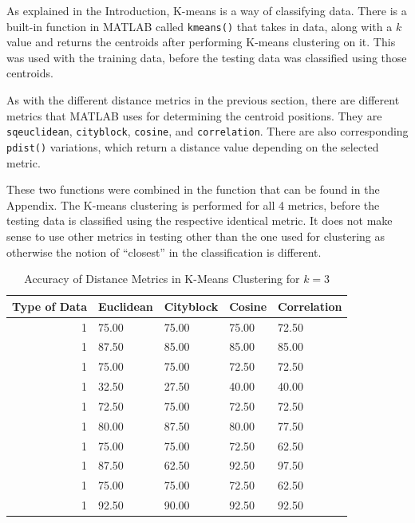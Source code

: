 \documentclass[a4paper, 10pt, conference]{ieeeconf}
\begin{document}
As explained in the Introduction, K-means is a way of classifying data. There is a built-in function in MATLAB called \texttt{kmeans()} that takes in data, along with a $k$ value and returns the centroids after performing K-means clustering on it. This was used with the training data, before the testing data was classified using those centroids.

As with the different distance metrics in the previous section, there are different metrics that MATLAB uses for determining the centroid positions. They are \texttt{sqeuclidean}, \texttt{cityblock}, \texttt{cosine}, and \texttt{correlation}. There are also corresponding \texttt{pdist()} variations, which return a distance value depending on the selected metric.

These two functions were combined in the function that can be found in the Appendix. The K-means clustering is performed for all 4 metrics, before the testing data is classified using the respective identical metric. It does not make sense to use other metrics in testing other than the one used for clustering as otherwise the notion of ``closest'' in the classification is different.

\begin{table}[!ht]
\centering
\caption{Accuracy of Distance Metrics in K-Means Clustering for $k = 3$}
\label{tbl:k3}
\begin{tabular}{|r|llll|}
\hline
\textbf{Type of Data} & \textbf{Euclidean} & \textbf{Cityblock} & \textbf{Cosine} & \textbf{Correlation} \\ \hline
1 & 75.00 & 75.00 & 75.00 & 72.50\\
1 & 87.50 & 85.00 & 85.00 & 85.00\\
1 & 75.00 & 75.00 & 72.50 & 72.50\\
1 & 32.50 & 27.50 & 40.00 & 40.00\\
1 & 72.50 & 75.00 & 72.50 & 72.50\\
1 & 80.00 & 87.50 & 80.00 & 77.50\\
1 & 75.00 & 75.00 & 72.50 & 62.50\\
1 & 87.50 & 62.50 & 92.50 & 97.50\\
1 & 75.00 & 75.00 & 72.50 & 62.50\\
1 & 92.50 & 90.00 & 92.50 & 92.50\\ \hline
\end{tabular}
\end{table}
\end{document}
